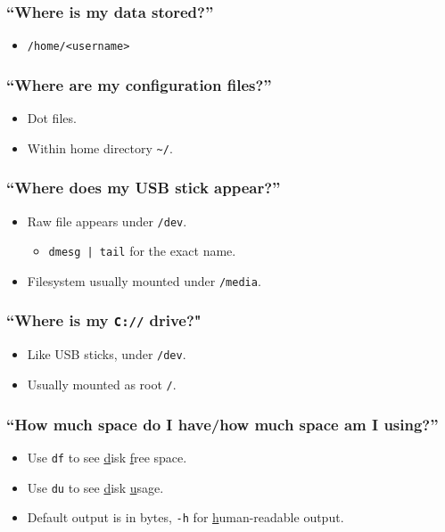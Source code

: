 \documentclass[xcolor={dvipsnames,svgnames},hyperref=dvips]{beamer}
\begin{document}
	\begin{frame}
		\frametitle{``Where is my data stored?''}
		\begin{itemize}
		\item \texttt{/home/<username>}
		\end{itemize}
	\end{frame}

	\begin{frame}
		\frametitle{``Where are my configuration files?''}
		\begin{itemize}
		\item Dot files.
		\item Within home directory \texttt{\textasciitilde /}.
		\end{itemize}
	\end{frame}

	\begin{frame}
		\frametitle{``Where does my USB stick appear?''}
		\begin{itemize}
		\item Raw file appears under \texttt{/dev}.
			\begin{itemize}
			\item \texttt{dmesg | tail} for the exact name.
			\end{itemize}
		\item Filesystem usually mounted under \texttt{/media}.
		\end{itemize}
	\end{frame}

	\begin{frame}
		\frametitle{``Where is my \texttt{C://} drive?"}
		\begin{itemize}
		\item Like USB sticks, under \texttt{/dev}.
		\item Usually mounted as root \texttt{/}.
		\end{itemize}
	\end{frame}

	\begin{frame}
		\frametitle{``How much space do I have/how much space am I using?''}
		\begin{itemize}
		\item Use \texttt{df} to see \underline{d}isk \underline{f}ree space.
		\item Use \texttt{du} to see \underline{d}isk \underline{u}sage.
		\item Default output is in bytes, \texttt{-h} for \underline{h}uman-readable output.
		\end{itemize}
	\end{frame}
\end{document}
